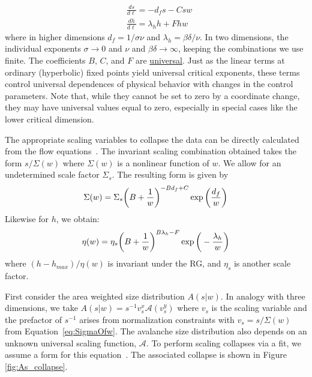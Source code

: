 \documentclass[reprint,amsmath,amssymb,aps,floatfix, prl]{revtex4-1}
\begin{document}
%
\begin{equation}
	\begin{split}
		&\frac{ds}{d\ell}= -d_f s-C s w\\
		&\frac{dh}{d\ell}= \lambda_h h+F h w
	\end{split}
\end{equation}
%
\noindent where in higher dimensions $d_f = 1/\sigma \nu$ and $\lambda_h = \beta \delta / \nu$. In two dimensions, the individual exponents $\sigma \to 0$ and
$\nu$ and $\beta \delta \to \infty$, keeping the combinations we use finite.  The coefficients $B$, $C$, and $F$ are \underline{universal}. Just as the linear terms at ordinary (hyperbolic) fixed points yield universal critical exponents, these terms control universal dependences of physical behavior with changes in the control parameters. Note that, while they cannot be set to zero by a coordinate change, they may have universal values equal to zero, especially in special cases like the lower critical dimension.\par
%
The appropriate scaling variables to collapse the data can be directly calculated from the flow equations~\cite[Section~\ref{supp-app:truncated}]{RFIM2Dsupp}. The invariant scaling combination obtained takes the form $s/\Sigma(w)$ where $\Sigma(w)$ is a nonlinear function of $w$. We allow for an undetermined scale factor $\Sigma_s$. The resulting form is given by 
%
\begin{equation}
 	\label{eq:SigmaOfw}
	\Sigma(w) = \Sigma_s \bigg{(}B+\frac{1}{w}\bigg{)}^{-B d_f+C}\exp \bigg{(}\frac{d_f}{w}\bigg{)}
\end{equation}
%
\noindent Likewise for $h$, we obtain:
%
\begin{equation}
 	\label{eq:etaOfw}
	\eta(w) = \eta_s\bigg{(}B+\frac{1}{w}\bigg{)}^{B \lambda_h-F}\exp \bigg{(}-\frac{\lambda_h}{w}\bigg{)}
\end{equation}
%
\noindent where $(h-h_{max})/\eta(w)$ is invariant under the RG, and $\eta_s$ is another scale factor. \par
%
First consider the area weighted size distribution $A(s|w)$. In analogy with three dimensions, we take $A(s|w) = s^{-1}v_s^x \mathcal{A}(v_s^y)$ where $v_s$ is the scaling variable and the prefactor of $s^{-1}$ arises from normalization constraints with $v_s=s/\Sigma(w)$ from Equation~\ref{eq:SigmaOfw}. The avalanche size distribution also depends on an unknown universal scaling function, $\mathcal{A}$. To perform scaling collapses via a fit, we assume a form for this equation~\cite[Section~\ref{supp-app:universal}]{RFIM2Dsupp}. The associated collapse is shown in Figure \ref{fig:As_collapse}. \par
\end{document}
